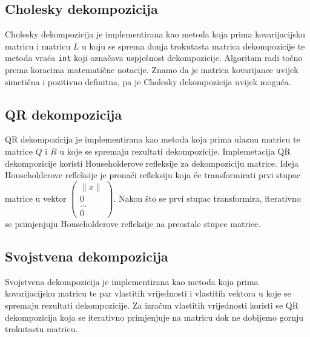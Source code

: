 \documentclass[zavrsnirad]{fer}
\begin{document}
\subsection{Cholesky dekompozicija}
Cholesky dekompozicija je implementirana
kao metoda koja prima kovarijacijsku matricu i matricu $L$ u koju se sprema
donja trokutasta matrica dekompozicije te metoda vraća \texttt{int} koji
označava uspješnost dekompozicije.
Algoritam radi točno prema koracima matematične notacije.
Znamo da je matrica kovarijance uvijek simetična i
pozitivno definitna, pa je Cholesky dekompozicija uvijek moguća.

\subsection{QR dekompozicija}
QR dekompozicija je implementirana kao metoda koja prima ulaznu matricu
te matrice $Q$ i $R$ u koje se spremaju rezultati dekompozicije.
Implemetacija QR dekompozicije koristi Householderove refleksije za
dekompoziciju matrice. Ideja Householderove refleksije je pronaći
refleksiju koja će transformirati prvi stupac matrice u vektor
$\begin{pmatrix} \|x\| \\ 0 \\ \dots \\ 0 \end{pmatrix}$.
Nakon što se prvi stupac transformira, iterativno se primjenjuju
Householderove refleksije na preostale stupce matrice.


\subsection{Svojstvena dekompozicija}
Svojstvena dekompozicija je implementirana kao metoda koja prima
kovarijacijsku matricu te par vlastitih vrijednosti i vlastitih vektora u koje
se spremaju rezultati dekompozicije.
Za izračun vlastitih vrijednosti koristi se QR dekompozicija
koja se iterativno primjenjuje na matricu dok ne dobijemo
gornju trokutastu matricu.
\end{document}
